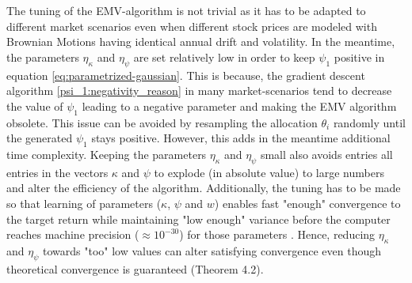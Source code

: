 \documentclass[oneside, a4paper, onecolumn, 11pt]{article}
\begin{document}
The tuning of the EMV-algorithm is not trivial as it has to be adapted to different market scenarios even when different stock prices are modeled with Brownian Motions having identical annual drift and volatility. 
In the meantime, the parameters $\eta_\kappa$ and $\eta_\psi$ are set relatively low in order to keep $\psi_1$ positive in equation \eqref{eq:parametrized-gaussian}. This is because, the gradient descent algorithm \eqref{psi_1:negativity_reason} in many market-scenarios tend to decrease the value of $\psi_1$ leading to a negative parameter and making the EMV algorithm obsolete. This issue can be avoided by resampling the allocation $\theta_i$ randomly until the generated $\psi_1$ stays positive. However, this adds in the meantime additional time complexity.
Keeping the parameters $\eta_\kappa$ and $\eta_\psi$ small also avoids entries all entries in the vectors $\kappa$ and $\psi$ to  explode (in absolute value) to large numbers and alter the efficiency of the algorithm. Additionally, the tuning has to be made so that learning of parameters ($\kappa$, $\psi$ and $w$) enables fast "enough" convergence to the target return while maintaining "low enough" variance before the computer reaches machine precision ($\approx 10^{-30}$) for those parameters \cite{Hao2024}. Hence, reducing $\eta_{\kappa}$ and $\eta_{\psi}$ towards "too" low values can alter satisfying convergence even though theoretical convergence is guaranteed (Theorem 4.2).
\end{document}
